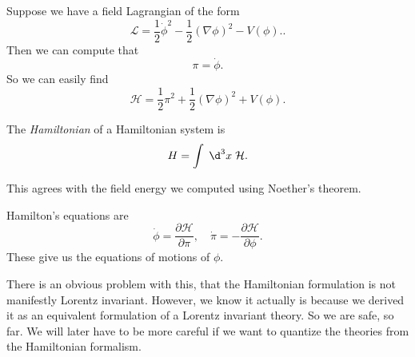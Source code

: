 \documentclass[a4paper]{article}
\begin{document}
\begin{eg}
  Suppose we have a field Lagrangian of the form
  \[
    \mathcal{L} = \frac{1}{2} \dot{\phi}^2 - \frac{1}{2} (\nabla \phi)^2 - V(\phi)..
  \]
  Then we can compute that
  \[
    \pi = \dot\phi.
  \]
  So we can easily find
  \[
    \mathcal{H} = \frac{1}{2}\pi^2 + \frac{1}{2}(\nabla \phi)^2 + V(\phi).
  \]
\end{eg}

\begin{defi}[Hamiltonian]
  The \emph{Hamiltonian} of a Hamiltonian system is
  \[
    H = \int\;\d^3 x\; \mathcal{H}.
  \]
\end{defi}
This agrees with the field energy we computed using Noether's theorem.

\begin{defi}
  Hamilton's equations are
  \[
    \dot{\phi} = \frac{\partial \mathcal{H}}{\partial \pi},\quad \dot{\pi} = -\frac{\partial \mathcal{H}}{\partial \phi}.
  \]
  These give us the equations of motions of $\phi$.
\end{defi}
There is an obvious problem with this, that the Hamiltonian formulation is not manifestly Lorentz invariant. However, we know it actually is because we derived it as an equivalent formulation of a Lorentz invariant theory. So we are safe, so far. We will later have to be more careful if we want to quantize the theories from the Hamiltonian formalism.
\end{document}
